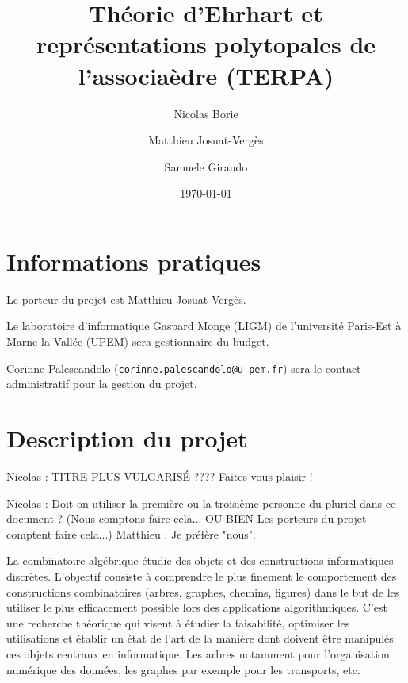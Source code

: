 \documentclass[a4paper, 10pt]{article}
\title{Théorie d'Ehrhart et représentations polytopales de
l'associaèdre (TERPA)}
\date{\today}
\author{Nicolas Borie \and Matthieu Josuat-Verg\`es \and Samuele Giraudo}
\numberwithin{equation}{subsection}
\begin{document}
\maketitle

\section{Informations pratiques}
Le porteur du projet est Matthieu Josuat-Vergès.
\medbreak

Le laboratoire d'informatique Gaspard Monge (LIGM) de l'université
Paris-Est à Marne-la-Vallée (UPEM) sera gestionnaire du
budget.
\medbreak

Corinne Palescandolo
(\href{mailto:corinne.palescandolo@u-pem.fr}
{\tt corinne.palescandolo@u-pem.fr})
sera le contact administratif pour la gestion du projet.
\medbreak

\section{Description du projet}

Nicolas : TITRE PLUS VULGARISÉ ???? Faites vous plaisir !

Nicolas : Doit-on utiliser la première ou la troisième personne du pluriel dans ce document ?
(Nous comptons faire cela... OU BIEN Les porteurs du projet comptent faire cela...)
Matthieu : Je préfère "nous".

La combinatoire algébrique étudie des objets et des constructions
informatiques discrètes. L'objectif consiste à comprendre le plus
finement le comportement des constructions combinatoires (arbres,
graphes, chemins, figures) dans le but de les utiliser le plus
efficacement possible lors des applications algorithmiques. C'est une
recherche théorique qui visent à étudier la faisabilité, optimiser les
utilisations et établir un état de l'art de la manière dont doivent
être manipulés ces objets centraux en informatique. Les arbres
notamment pour l'organisation numérique des données, les graphes par
exemple pour les transports, etc.
\end{document}
